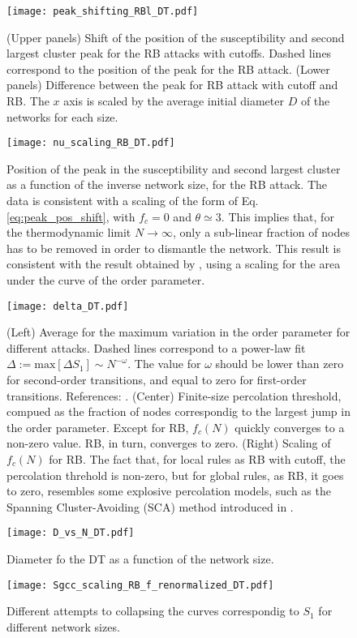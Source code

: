 \documentclass{article}
\begin{document}
\begin{figure}
\centering
\texttt{[image: peak\_shifting\_RBl\_DT.pdf]}
\caption{(Upper panels) Shift of the position of the susceptibility and second largest cluster peak for the RB attacks with cutoffs. Dashed lines correspond to the position of the peak for the RB attack. (Lower panels) Difference between the peak for RB attack with cutoff and RB. The $x$ axis is scaled by the average initial diameter $D$ of the networks for each size.}
\end{figure}

\begin{figure}
\centering
\texttt{[image: nu\_scaling\_RB\_DT.pdf]}
\caption{Position of the peak in the susceptibility and second largest cluster as a function of the inverse network size, for the RB attack. The data is consistent with a scaling of the form of Eq. \ref{eq:peak_pos_shift}, with $f_c = 0$ and $\theta \simeq 3$. This implies that, for the thermodynamic limit $N\rightarrow \infty$, only a sub-linear fraction of nodes has to be removed in order to dismantle the network. This result is consistent with the result obtained by \cite{Norrenbrock2016FragmentationAttacks}, using a scaling for the area under the curve of the order parameter.}
\end{figure}


\begin{figure}
\centering
\texttt{[image: delta\_DT.pdf]}
\caption{(Left) Average for the maximum variation in the order parameter for different attacks. Dashed lines correspond to a power-law fit $\Delta := \mathrm{max}[\Delta S_1] \sim N^{-\omega}$. The value for $\omega$ should be lower than zero for second-order transitions, and equal to zero for first-order transitions. References: \cite{Trevelyan2018DegreeInformation,Bastas2014a,Nagler2011a,Fan2020}. (Center) Finite-size percolation threshold, compued as the fraction of nodes correspondig to the largest jump in the order parameter. Except for RB, $f_c(N)$ quickly converges to a non-zero value. RB, in turn, converges to zero. (Right) Scaling of $f_c(N)$ for RB. The fact that, for local rules as RB with cutoff, the percolation threhold is non-zero, but for global rules, as RB, it goes to zero, resembles some explosive percolation models, such as the Spanning Cluster-Avoiding (SCA) method introduced in \cite{Cho2013}. }
\end{figure}

\begin{figure}
\centering
\texttt{[image: D\_vs\_N\_DT.pdf]}
\caption{Diameter fo the DT as a function of the network size.}
\end{figure}

\begin{figure}
\centering
\texttt{[image: Sgcc\_scaling\_RB\_f\_renormalized\_DT.pdf]}
\caption{Different attempts to collapsing the curves correspondig to $S_1$ for different network sizes.}
\end{figure}




\end{document}
